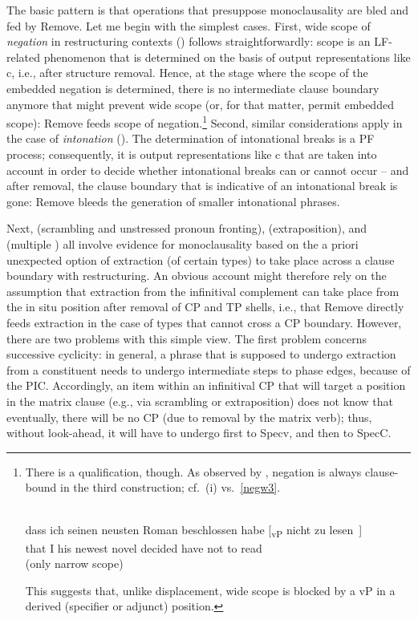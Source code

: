 \documentclass[output=paper]{langsci/langscibook}
\begin{document}
The basic pattern is that operations that presuppose monoclausality are bled
and fed by Remove. Let me begin with the simplest cases. First, wide scope of
{\itshape negation} in restructuring contexts () follows
straightforwardly: scope is an \gls{LF}-related phenomenon that is determined
on the basis of output representations like c, i.e., after structure
removal. Hence, at the stage where the  scope of the embedded negation is
determined, there is no intermediate clause boundary anymore that might prevent
wide scope (or, for that matter, permit embedded scope):  Remove feeds scope of
negation.\footnote{There is a qualification, though. As observed by
    \citet{Santorini&Kroch:91}, negation is always clause-bound in the third
    construction; cf.\ (i) vs.\ \eqref{negw3}.

\begin{exe}
     \\
    \gll dass ich seinen neusten Roman beschlossen habe [\textsubscript{vP} nicht zu lesen~]\\
        that I his newest novel\textsubscript{\Acc} decided have {} not to read\\
    \trans (only narrow scope)
\end{exe}

This suggests that, unlike displacement, wide scope is blocked by a vP in a
derived (specifier or adjunct) position.} Second, similar considerations apply
in the case of {\itshape intonation} (). The determination of intonational
breaks is a \gls{PF} process; consequently, it is output representations like
c that are taken into account in order to decide whether
intonational breaks can or cannot occur -- and after  removal, the clause
boundary that is indicative of an intonational break is gone: Remove bleeds the
generation of smaller intonational phrases.

Next,  (scrambling and unstressed pronoun fronting), 
(extraposition), and  (multiple ) all involve evidence for
monoclausality based on the a priori unexpected option of extraction (of
certain  types) to take place across a clause boundary with
restructuring. An obvious account might therefore rely on the assumption that
extraction from the infinitival complement can take place from the in situ
position after removal of CP and TP shells, i.e., that Remove directly feeds
extraction in the case of  types that cannot cross a CP boundary.
However, there are two problems with this simple view.  The first problem
concerns successive cyclicity: in general, a phrase that is supposed to undergo
extraction from a constituent needs to undergo intermediate  steps to
phase edges, because of the \gls{PIC}. Accordingly, an item within an
infinitival CP that will target a position in the matrix clause (e.g., via
scrambling or extraposition) does not know that eventually, there will be no CP
(due to removal by the matrix verb); thus, without look-ahead, it will have to
undergo  first to Specv, and then to SpecC.
\end{document}
